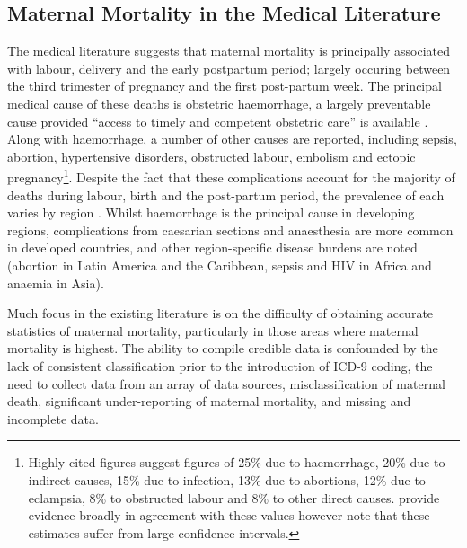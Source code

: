 \documentclass{article}[12pt,subeqn]
\begin{document}
\begin{spacing}{1.4}
\section{Maternal Mortality in the Medical Literature}
\label{scn:medliterature}
The medical literature suggests that maternal mortality is principally 
associated with labour, delivery and the early postpartum period; largely 
occuring between the third trimester of pregnancy and the first post-partum 
week. The principal medical cause of these deaths is obstetric haemorrhage, a 
largely preventable cause provided ``access to timely and competent obstetric 
care'' is available \citep{RonsmansGraham2006}.  Along with haemorrhage, a number 
of other causes are reported, including sepsis, abortion, hypertensive disorders, 
obstructed labour, embolism and ectopic pregnancy\footnote{Highly cited figures 
\citep{WHOetal1991} suggest figures of 25\% due to haemorrhage, 20\% due to 
indirect causes, 15\% due to infection, 13\% due to abortions, 12\% due to 
eclampsia, 8\% to obstructed labour and 8\% to other direct causes. 
\citet{Khanetal2006} provide evidence broadly in agreement with these values 
however note that these estimates suffer from large confidence intervals.}.  
Despite the fact that these complications account for the majority of deaths 
during labour, birth and the post-partum period, the prevalence of each varies 
by region \citep{Khanetal2006}.  Whilst haemorrhage is the principal cause in 
developing regions, complications from caesarian sections and anaesthesia are more 
common in developed countries, and other region-specific disease burdens are noted 
(abortion in Latin America and the Caribbean, sepsis and HIV in Africa and anaemia 
in Asia).

Much focus in the existing literature is on the difficulty of obtaining accurate 
statistics of maternal mortality, particularly in those areas where maternal 
mortality is highest\citep{RonsmansGraham2006, MccarthyMaine1992, 
McAlisterBaskett2006}.  The ability to compile credible data is confounded by the 
lack of consistent classification prior to the introduction of ICD-9 coding, the 
need to collect data from an array of data sources, misclassification of maternal 
death, significant under-reporting of maternal mortality, and missing and 
incomplete data\citep{Yazbeck2007, Hoganetal2010}.


\end{spacing}
\end{document}
